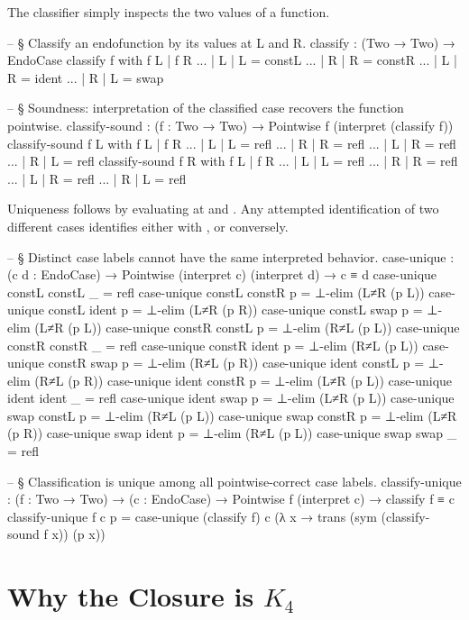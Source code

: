 \documentclass[11pt]{article}
\begin{document}
The classifier simply inspects the two values of a function.

\begin{code}
-- § Classify an endofunction by its values at L and R.
classify : (Two → Two) → EndoCase
classify f with f L | f R
... | L | L = constL
... | R | R = constR
... | L | R = ident
... | R | L = swap

-- § Soundness: interpretation of the classified case recovers the function pointwise.
classify-sound : (f : Two → Two) → Pointwise f (interpret (classify f))
classify-sound f L with f L | f R
... | L | L = refl
... | R | R = refl
... | L | R = refl
... | R | L = refl
classify-sound f R with f L | f R
... | L | L = refl
... | R | R = refl
... | L | R = refl
... | R | L = refl
\end{code}

Uniqueness follows by evaluating at  and
.  Any attempted identification of two
different cases identifies either  with
, or conversely.

\begin{code}
-- § Distinct case labels cannot have the same interpreted behavior.
case-unique : (c d : EndoCase) → Pointwise (interpret c) (interpret d) → c ≡ d
case-unique constL constL _ = refl
case-unique constL constR p = ⊥-elim (L≠R (p L))
case-unique constL ident  p = ⊥-elim (L≠R (p R))
case-unique constL swap   p = ⊥-elim (L≠R (p L))
case-unique constR constL p = ⊥-elim (R≠L (p L))
case-unique constR constR _ = refl
case-unique constR ident  p = ⊥-elim (R≠L (p L))
case-unique constR swap   p = ⊥-elim (R≠L (p R))
case-unique ident  constL p = ⊥-elim (R≠L (p R))
case-unique ident  constR p = ⊥-elim (L≠R (p L))
case-unique ident  ident  _ = refl
case-unique ident  swap   p = ⊥-elim (L≠R (p L))
case-unique swap   constL p = ⊥-elim (R≠L (p L))
case-unique swap   constR p = ⊥-elim (L≠R (p R))
case-unique swap   ident  p = ⊥-elim (R≠L (p L))
case-unique swap   swap   _ = refl

-- § Classification is unique among all pointwise-correct case labels.
classify-unique :
  (f : Two → Two) → (c : EndoCase) → Pointwise f (interpret c) → classify f ≡ c
classify-unique f c p =
  case-unique (classify f) c
    (λ x → trans (sym (classify-sound f x)) (p x))
\end{code}

\section{Why the Closure is \texorpdfstring{$K_4$}{K4}}
\end{document}

